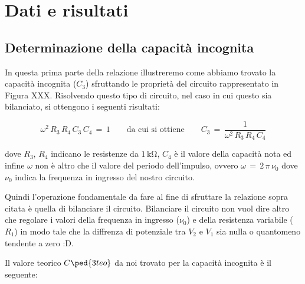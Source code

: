 \section*{Dati e risultati}

\subsection*{Determinazione della capacità incognita}

In questa prima parte della relazione illustreremo come abbiamo trovato la capacità incognita ($C_3$) sfruttando le proprietà del circuito rappresentato in Figura XXX.
Risolvendo questo tipo di circuito, nel caso in cui questo sia bilanciato, si ottengono i seguenti risultati:

\begin{equation}
	\omega^2\,R_3\,R_4\,C_3\,C_4 \,=\, 1 \qquad \text{da cui si ottiene} \qquad C_3 \,=\, \frac{1}{\omega^2\,R_3\,R_4\,C_4}
	\label{eq:C_imm}
\end{equation}


dove $R_3,\,R_4$ indicano le resistenze da $1\,\si{\kilo\ohm}$, $C_4$ è il valore della capacità nota ed infine $\omega$ non è altro che il valore del periodo dell'impulso, ovvero $\omega \,=\, 2\,\pi\,\nu_0$ dove $\nu_0$ indica la frequenza in ingresso del nostro circuito.

Quindi l'operazione fondamentale da fare al fine di sfruttare la relazione sopra citata è quella di bilanciare il circuito. Bilanciare il circuito non vuol dire altro che regolare i valori della frequenza in ingresso ($\nu_0$) e della resistenza variabile ($R_1$) in modo tale che la diffrenza di potenziale tra $V_2$ e $V_1$ sia nulla o quantomeno tendente a zero :D.

Il valore teorico $C\ped{3teo}$ da noi trovato per la capacità incognita è il seguente:

